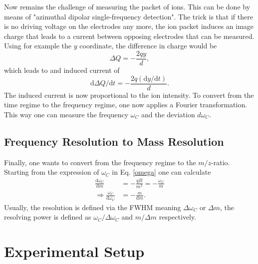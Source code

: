 \documentclass[a4paper,10pt]{article}
\begin{document}
Now remains the challenge of measuring the packet of ions. This can be done by means of "azimuthal dipolar single-frequency detection". The trick is that if there is no driving voltage on the electrodes any more, the ion packet induces an image charge that leads to a current between opposing electrodes that can be measured. Using for example the $y$ coordinate, the difference in charge would be 
\begin{equation*}
	\Delta Q = - \frac{2 q y }{d},
\end{equation*}
which leads to and induced current of 
\begin{equation}
	\mathrm{d}\Delta Q / \mathrm{d}t = - \frac{2 q (\mathrm{d}y / \mathrm{d}t) }{d}. 
\end{equation}
The induced current is now proportional to the ion intensity. To convert from the time regime to the frequency regime, one now applies a Fourier transformation. This way one can measure the frequency $\omega_C$ and the deviation $d\omega_C$. 

\subsection{Frequency Resolution to Mass Resolution}
Finally, one wants to convert from the frequency regime to the $m/z$-ratio. Starting from the expression of $\omega_C$ in Eq. \ref{omega} one can calculate
\begin{equation}
	\begin{split}
	\frac{\mathrm{d} \omega_C}{\mathrm{d} m} &= - \frac{q B}{m^2} = - \frac{\omega_C}{m}\\
	\Rightarrow \frac{\omega_C}{\mathrm{d} \omega_C} &= - \frac{m}{\mathrm{d}m}.
	\end{split}
\end{equation}
Usually, the resolution is defined via the FWHM meaning $\Delta \omega_C$ or $\Delta m$, the resolving power is defined as $\omega_C / \Delta \omega_C$ and $m / \Delta m$ respectively. 

\section{Experimental Setup}
\end{document}
